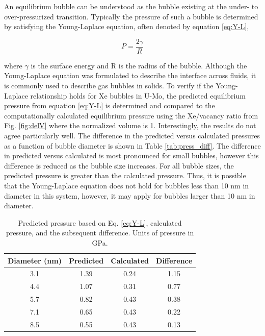\documentclass[review]{elsarticle}
\providecommand{\DIFaddtex}[1]{{\protect\color{blue} \sf #1}} %
\providecommand{\DIFaddbegin}{} %
\providecommand{\DIFaddend}{} %
\providecommand{\DIFadd}[1]{\texorpdfstring{\DIFaddtex{#1}}{#1}} %
\newcommand{\DIFaddincludegraphics}[2][]{{\color{blue}\fbox{\DIFOincludegraphics[#1]{#2}}}} %
\DeclareRobustCommand{\DIFaddbegin}{\DIFOaddbegin \let\includegraphics\DIFaddincludegraphics} %
\DeclareRobustCommand{\DIFaddend}{\DIFOaddend \let\includegraphics\DIFOincludegraphics} %
\begin{document}
An equilibrium bubble can be understood as the bubble existing at the under- to over-pressurized transition. Typically the pressure of such a bubble is determined by satisfying the Young-Laplace equation, often denoted by equation \ref{eq:Y-L},

\begin{equation}
\label{eq:Y-L}
P = \frac{2\gamma}{R}
\end{equation}

where $\gamma$ is the surface energy and R is the radius of the bubble. Although the Young-Laplace equation was formulated to describe the interface across fluids, it is commonly used to describe gas bubbles in solids. To verify if the Young-Laplace relationship holds for Xe bubbles in U-Mo, the predicted equilibrium pressure from \DIFaddbegin \DIFadd{equation }\DIFaddend \ref{eq:Y-L} is determined and compared to the computationally calculated equilibrium pressure using the Xe/vacancy ratio from Fig. \ref{fig:delV} where the normalized volume is 1. Interestingly, the results do not agree particularly well. The difference in the predicted versus calculated pressures as a function of bubble diameter is shown in Table \ref{tab:press_diff}. The difference in predicted versus calculated is most pronounced for small bubbles, however this difference is reduced as the bubble size increases. For all bubble sizes, the predicted pressure is greater than the calculated pressure. Thus, it is possible that the Young-Laplace equation does not hold for bubbles less than 10 nm in diameter in this system, however, it may apply for bubbles larger than 10 nm in diameter. 

\begin{table}[h!]
\caption{Predicted pressure based on Eq. \ref{eq:Y-L}, calculated pressure, and the subsequent difference. Units of pressure in GPa. }
\label{tab:press_diff}
\begin{center}
\begin{tabular}{|c|c|c|c|}
     \hline
Diameter (nm) & Predicted & Calculated & Difference \\
\hline
3.1 & 1.39 & 0.24 & 1.15 \\
4.4 & 1.07 & 0.31 & 0.77 \\
5.7 & 0.82 & 0.43 & 0.38 \\
7.1 & 0.65 & 0.43 & 0.22 \\
8.5 & 0.55 & 0.43 & 0.13 \\
     \hline
\end{tabular}
\end{center}
\label{default}
\end{table}%
\end{document}
